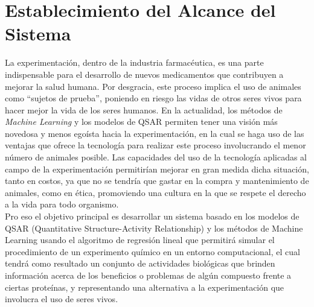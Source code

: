 \section{Establecimiento del Alcance del Sistema}{
\noindent La experimentación, dentro de la industria farmacéutica, es una parte indispensable para el desarrollo de nuevos medicamentos que contribuyen a mejorar la salud humana. Por desgracia, este proceso implica el uso de animales como “sujetos de prueba”, poniendo en riesgo las vidas de otros seres vivos para hacer mejor la vida de los seres humanos. En la actualidad, los métodos de \textit{Machine Learning} y los modelos de QSAR permiten tener una visión más novedosa y menos egoísta hacia la experimentación, en la cual se haga uso de las ventajas que ofrece la tecnología para realizar este proceso involucrando el menor número de animales posible. Las capacidades del uso de la tecnología aplicadas al campo de la experimentación permitirían mejorar en gran medida dicha situación, tanto en costos, ya que no se tendría que gastar en la compra y mantenimiento de animales, como en ética, promoviendo una cultura en la que se respete el derecho a la vida para todo organismo.\\

\noindent Pro eso el objetivo principal es desarrollar un sistema basado en los modelos de QSAR (Quantitative Structure-Activity Relationship) y los métodos de Machine Learning usando el algoritmo de regresión lineal que permitirá simular el procedimiento de un experimento químico en un entorno computacional, el cual tendrá como resultado un conjunto de actividades biológicas que brinden información acerca de los beneficios o problemas de algún compuesto frente a ciertas proteínas, y representando una alternativa a la experimentación que involucra el uso de seres vivos.
}
\newpage
